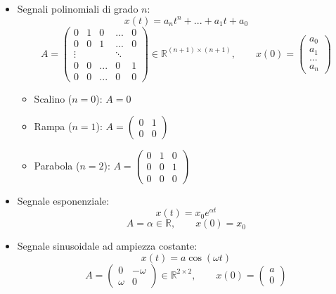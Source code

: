 \begin{itemize}
	\item Segnali polinomiali di grado $n$:  
	\begin{equation*}
		x(t)=a_nt^n + ... + a_1t + a_0
	\end{equation*}
	\begin{equation*}
		A=\begin{pmatrix}
		0 & 1 & 0 & ... & 0\\
		0 & 0 & 1 & ... & 0\\
		\vdots & & & \ddots &\\
		0 & 0 & ... & 0 & 1\\
		0 & 0 & ... & 0 & 0
		\end{pmatrix} \in \mathbb{R}^{(n+1) \times (n+1)}, \qquad x(0)=\begin{pmatrix}a_0 \\ a_1 \\ ... \\ a_n\end{pmatrix}
	\end{equation*}
	\begin{itemize}
		\item Scalino  ($n=0$): $A=0$
		\item Rampa    ($n=1$): $A=\begin{pmatrix}0 & 1\\0 & 0\end{pmatrix}$
		\item Parabola ($n=2$): $A=\begin{pmatrix}0 & 1 & 0\\0 & 0 & 1\\0 & 0 & 0\end{pmatrix}$
	\end{itemize}
	\item Segnale esponenziale:
		\begin{equation*}
		x(t)=x_0e^{\alpha t}
		\end{equation*}
		\begin{equation*}
		A=\alpha \in \mathbb{R}, \qquad x(0)=x_0
		\end{equation*}
	\item Segnale sinusoidale ad ampiezza costante:
		\begin{equation*}
		x(t)=a\cos(\omega t)
		\end{equation*}
		\begin{equation*}
		A=\begin{pmatrix}0 & -\omega\\ \omega & 0\end{pmatrix} \in \mathbb{R}^{2 \times 2}, \qquad x(0)=\begin{pmatrix}a \\ 0\end{pmatrix}

\end{equation*}
\end{itemize}
